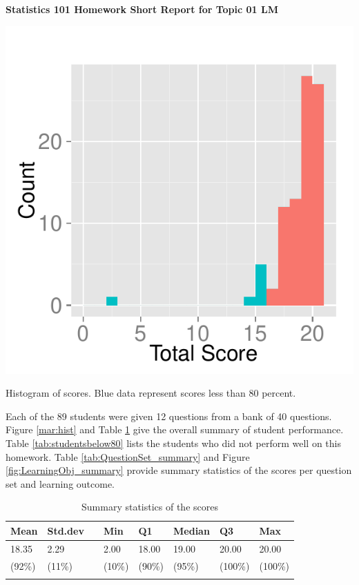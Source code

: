 \documentclass[12pt,english,nohyper]{tufte-handout}\usepackage[]{graphicx}\usepackage[]{color}
\begin{document}
\centerline{\Large\bf Statistics 101 Homework Short Report for Topic 01 LM}
\vspace{1cm}

\begin{marginfigure}
\includegraphics[width=0.98\linewidth]{Topic01_LM_score}
\caption{\label{mar:hist}Histogram of scores. Blue data represent scores less than 80 percent.}
\end{marginfigure}

Each of the 89 students were given 12 questions from a bank of 40 questions. Figure \ref{mar:hist} and Table \ref{tab:summary} give the overall summary of student performance. Table \ref{tab:studentsbelow80} lists the students who did not perform well on this homework. Table \ref{tab:QuestionSet_summary} and Figure \ref{fig:LearningObj_summary} provide summary statistics of the scores per question set and learning outcome.
\bigskip{}

\begin{longtable}{llllllll}
  \hline
Mean & Std.dev &   & Min & Q1 & Median & Q3 & Max \\ 
  \hline
18.35 & 2.29 &  & 2.00 & 18.00 & 19.00 & 20.00 & 20.00 \\ 
  (92\%) & (11\%) &  & (10\%) & (90\%) & (95\%) & (100\%) & (100\%) \\ 
   \hline
\hline
\caption{Summary statistics of the scores} 
\label{tab:summary}
\end{longtable}
\end{document}
